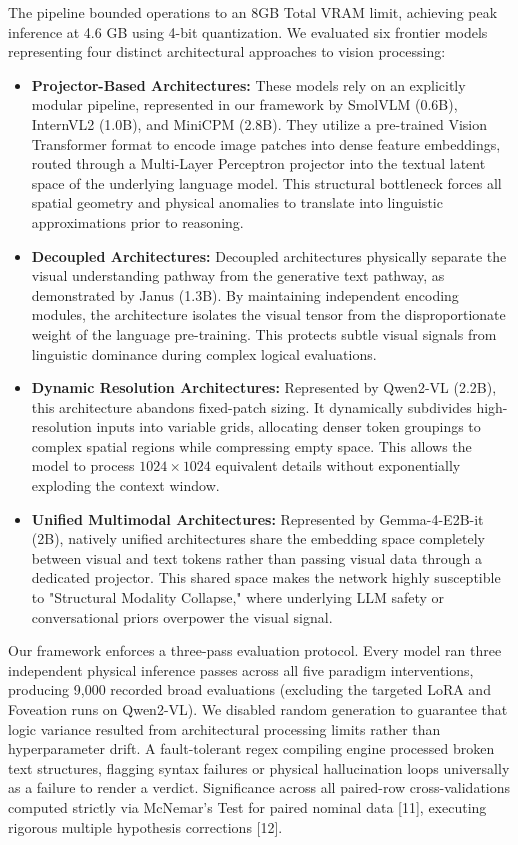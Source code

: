 \documentclass{article}
\begin{document}
The pipeline bounded operations to an 8GB Total VRAM limit, achieving peak inference at 4.6 GB using 4-bit quantization. We evaluated six frontier models representing four distinct architectural approaches to vision processing:
\begin{itemize}
    \item \textbf{Projector-Based Architectures:} These models rely on an explicitly modular pipeline, represented in our framework by SmolVLM (0.6B), InternVL2 (1.0B), and MiniCPM (2.8B). They utilize a pre-trained Vision Transformer format to encode image patches into dense feature embeddings, routed through a Multi-Layer Perceptron projector into the textual latent space of the underlying language model. This structural bottleneck forces all spatial geometry and physical anomalies to translate into linguistic approximations prior to reasoning.
    \item \textbf{Decoupled Architectures:} Decoupled architectures physically separate the visual understanding pathway from the generative text pathway, as demonstrated by Janus (1.3B). By maintaining independent encoding modules, the architecture isolates the visual tensor from the disproportionate weight of the language pre-training. This protects subtle visual signals from linguistic dominance during complex logical evaluations.
    \item \textbf{Dynamic Resolution Architectures:} Represented by Qwen2-VL (2.2B), this architecture abandons fixed-patch sizing. It dynamically subdivides high-resolution inputs into variable grids, allocating denser token groupings to complex spatial regions while compressing empty space. This allows the model to process $1024 \times 1024$ equivalent details without exponentially exploding the context window.
    \item \textbf{Unified Multimodal Architectures:} Represented by Gemma-4-E2B-it (2B), natively unified architectures share the embedding space completely between visual and text tokens rather than passing visual data through a dedicated projector. This shared space makes the network highly susceptible to "Structural Modality Collapse," where underlying LLM safety or conversational priors overpower the visual signal.
\end{itemize}

Our framework enforces a three-pass evaluation protocol. Every model ran three independent physical inference passes across all five paradigm interventions, producing 9,000 recorded broad evaluations (excluding the targeted LoRA and Foveation runs on Qwen2-VL). We disabled random generation to guarantee that logic variance resulted from architectural processing limits rather than hyperparameter drift. A fault-tolerant regex compiling engine processed broken text structures, flagging syntax failures or physical hallucination loops universally as a failure to render a verdict. Significance across all paired-row cross-validations computed strictly via McNemar's Test for paired nominal data [11], executing rigorous multiple hypothesis corrections [12].
\end{document}
